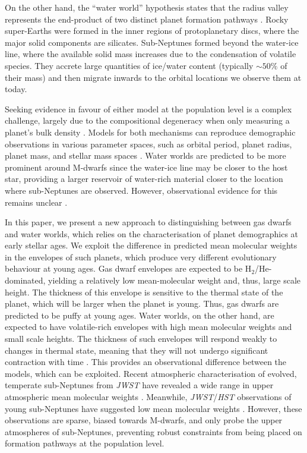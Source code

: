 \documentclass[fleqn,usenatbib]{mnras}
\begin{document}
On the other hand, the ``water world'' hypothesis states that the radius valley represents the end-product of two distinct planet formation pathways \citep[e.g.][]{Mordasini2009,Venturini2016,Raymond2018,Zeng2019,Mousis2020,Burn2024}. Rocky super-Earths were formed in the inner regions of protoplanetary discs, where the major solid components are silicates. Sub-Neptunes formed beyond the water-ice line, where the available solid mass increases due to the condensation of volatile species. They accrete large quantities of ice/water content (typically $\sim 50\%$ of their mass) and then migrate inwards to the orbital locations we observe them at today.

Seeking evidence in favour of either model at the population level is a complex challenge, largely due to the compositional degeneracy when only measuring a planet's bulk density \citep[e.g.][]{Rogers2015,Bean2021}. Models for both mechanisms can reproduce demographic observations in various parameter spaces, such as orbital period, planet radius, planet mass, and stellar mass spaces \cite[e.g.][]{Gupta2019,Rogers2021,Burn2024}. Water worlds are predicted to be more prominent around M-dwarfs since the water-ice line may be closer to the host star, providing a larger reservoir of water-rich material closer to the location where sub-Neptunes are observed. However, observational evidence for this remains unclear \citep{Rogers2023b,Ho2024}. 

In this paper, we present a new approach to distinguishing between gas dwarfs and water worlds, which relies on the characterisation of planet demographics at early stellar ages. We exploit the difference in predicted mean molecular weights in the envelopes of such planets, which produce very different evolutionary behaviour at young ages. Gas dwarf envelopes are expected to be H$_2$/He-dominated, yielding a relatively low mean-molecular weight and, thus, large scale height. The thickness of this envelope is sensitive to the thermal state of the planet, which will be larger when the planet is young. Thus, gas dwarfs are predicted to be puffy at young ages. Water worlds, on the other hand, are expected to have volatile-rich envelopes with high mean molecular weights and small scale heights. The thickness of such envelopes will respond weakly to changes in thermal state, meaning that they will not undergo significant contraction with time \citep[see also][]{Lopez2017,Aguichine2024}. This provides an observational difference between the models, which can be exploited. Recent atmospheric characterisation of evolved, temperate sub-Neptunes from \textit{JWST} have revealed a wide range in upper atmospheric mean molecular weights \citep[e.g.][]{Madhusudhan2023,Benneke2024,Piaulet-Ghorayeb2024,Davenport2025}. Meanwhile, \textit{JWST}/\textit{HST} observations of young sub-Neptunes have suggested low mean molecular weights \citep[e.g.][]{Barat2024,Thao2024}. However, these observations are sparse, biased towards M-dwarfs, and only probe the upper atmospheres of sub-Neptunes, preventing robust constraints from being placed on formation pathways at the population level.
\end{document}
